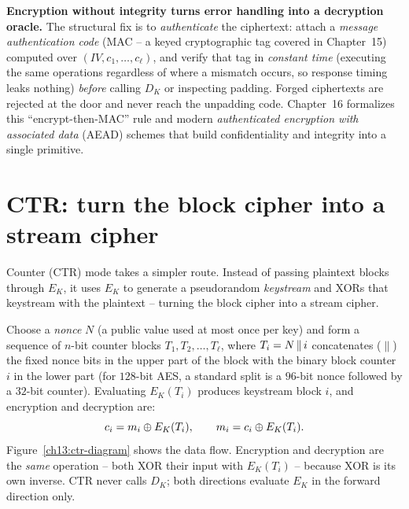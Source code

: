 \begin{whybox}
\textbf{Encryption without integrity turns error handling into a decryption oracle.} The structural fix is to \emph{authenticate} the ciphertext: attach a \emph{message authentication code} (MAC -- a keyed cryptographic tag covered in Chapter~15) computed over $(\mathit{IV}, c_1, \dots, c_\ell)$, and verify that tag in \emph{constant time} (executing the same operations regardless of where a mismatch occurs, so response timing leaks nothing) \emph{before} calling $D_K$ or inspecting padding. Forged ciphertexts are rejected at the door and never reach the unpadding code. Chapter~16 formalizes this ``encrypt-then-MAC'' rule and modern \emph{authenticated encryption with associated data} (AEAD) schemes that build confidentiality and integrity into a single primitive.
\end{whybox}

\section{CTR: turn the block cipher into a stream cipher}

Counter (CTR) mode takes a simpler route. Instead of passing plaintext blocks through $E_K$, it uses $E_K$ to generate a pseudorandom \emph{keystream} and XORs that keystream with the plaintext -- turning the block cipher into a stream cipher.

Choose a \emph{nonce} $N$ (a public value used at most once per key) and form a sequence of $n$-bit counter blocks $T_1, T_2, \dots, T_\ell$, where $T_i = N \,\|\, i$ concatenates ($\|$) the fixed nonce bits in the upper part of the block with the binary block counter $i$ in the lower part (for $128$-bit AES, a standard split is a $96$-bit nonce followed by a $32$-bit counter). Evaluating $E_K(T_i)$ produces keystream block $i$, and encryption and decryption are:
\[
c_i = m_i \oplus E_K(T_i), \qquad m_i = c_i \oplus E_K(T_i).
\]
Figure~\ref{ch13:ctr-diagram} shows the data flow. Encryption and decryption are the \emph{same} operation -- both XOR their input with $E_K(T_i)$ -- because XOR is its own inverse. CTR never calls $D_K$; both directions evaluate $E_K$ in the forward direction only.

